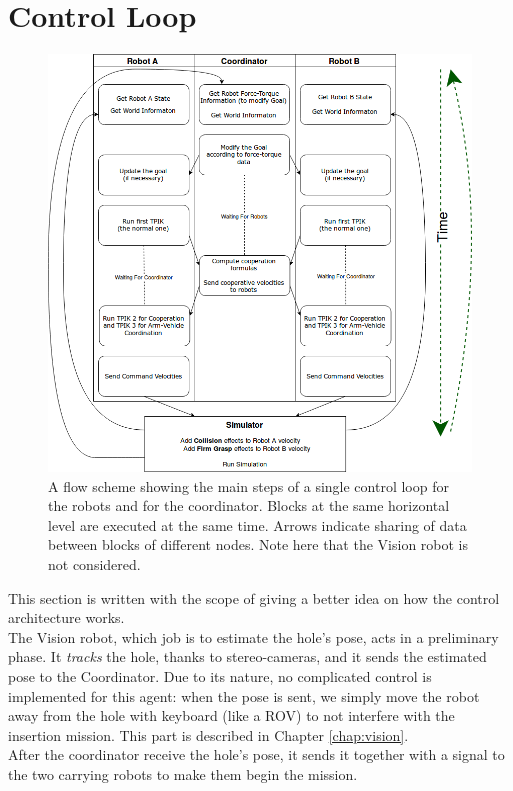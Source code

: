 \section{Control Loop}
\label{sec:controlLoop}
\begin{figure}[H]
	\centering
	\includegraphics[width=12cm]{flowScheme.png}	
	\caption[Flow Scheme of the Control Loop]{A flow scheme showing the main steps of a single control loop for the robots and for the coordinator. Blocks at the same horizontal level are executed at the same time. Arrows indicate sharing of data between blocks of different nodes. Note here that the Vision robot is not considered.}
	\label{fig:flowScheme}
\end{figure}

This section is written with the scope of giving a better idea on how the control architecture works.\\
The Vision robot, which job is to estimate the hole's pose, acts in a preliminary phase. It \textit{tracks} the hole, thanks to stereo-cameras, and it sends the estimated pose to the Coordinator. Due to its nature, no complicated control is implemented for this agent: when the pose is sent, we simply move the robot away from the hole with keyboard (like a ROV) to not interfere with the insertion mission. This part is described in Chapter \ref{chap:vision}.\\
After the coordinator receive the hole's pose, it sends it together with a signal to the two carrying robots to make them begin the mission.\\


